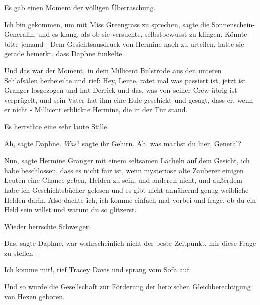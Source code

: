 Es gab einen Moment der völligen Überraschung.

\glqq{}Ich bin gekommen, um mit Miss Greengrass zu sprechen\grqq{}, sagte die
Sonnenschein-Generalin, und es klang, als ob sie versuchte, selbstbewusst zu
klingen. \glqq{}Könnte bitte jemand -\grqq{} Dem Gesichtsausdruck von Hermine
nach zu urteilen, hatte sie gerade bemerkt, dass Daphne funkelte.

Und das war der Moment, in dem Millicent Bulstrode aus den unteren Schlafsälen
herbeieilte und rief: \glqq{}Hey, Leute, ratet mal was passiert ist, jetzt ist
Granger losgezogen und hat Derrick und das, was von seiner Crew übrig ist
verprügelt, und sein Vater hat ihm eine Eule geschickt und gesagt, dass er, wenn
er nicht -\grqq{} Millicent erblickte Hermine, die in der Tür stand.

Es herrschte eine sehr laute Stille.

\glqq{}Äh\grqq{}, sagte Daphne. \emph{Was}? sagte ihr Gehirn. \glqq{}Äh, was
machst du hier, General?\grqq{}

\glqq{}Nun\grqq{}, sagte Hermine Granger mit einem seltsamen Lächeln auf dem
Gesicht, \glqq{}ich habe beschlossen, dass es nicht fair ist, wenn mysteriöse
alte Zauberer einigen Leuten eine Chance geben, Helden zu sein, und anderen
nicht, und außerdem habe ich Geschichtsbücher gelesen und es gibt nicht
annähernd genug weibliche Helden darin. Also dachte ich, ich komme einfach mal
vorbei und frage, ob du ein Held sein willst und warum du so glitzerst.\grqq{}

Wieder herrschte Schweigen.

\glqq{}Das\grqq{}, sagte Daphne, \glqq{}war wahrscheinlich nicht der beste
Zeitpunkt, mir diese Frage zu stellen -\grqq{}

\glqq{}Ich komme mit!\grqq{}, rief Tracey Davis und sprang vom Sofa auf.

Und so wurde die Gesellschaft zur Förderung der heroischen Gleichberechtigung
von Hexen geboren.


